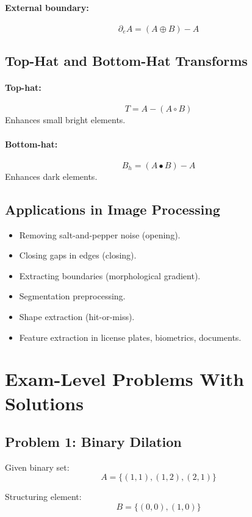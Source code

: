 \documentclass{AnantDocumentation}
\begin{document}
\paragraph{External boundary:}
\[
\partial_e A = (A \oplus B) - A
\]

\subsection{Top-Hat and Bottom-Hat Transforms}

\paragraph{Top-hat:}
\[
T = A - (A \circ B)
\]
Enhances small bright elements.

\paragraph{Bottom-hat:}
\[
B_h = (A \bullet B) - A
\]
Enhances dark elements.

\subsection{Applications in Image Processing}

\begin{itemize}
\item Removing salt-and-pepper noise (opening).
\item Closing gaps in edges (closing).
\item Extracting boundaries (morphological gradient).
\item Segmentation preprocessing.
\item Shape extraction (hit-or-miss).
\item Feature extraction in license plates, biometrics, documents.
\end{itemize}

\newpage
\section*{Exam-Level Problems With Solutions}

\subsection*{Problem 1: Binary Dilation}

Given binary set:
\[
A = \{(1,1),(1,2),(2,1)\}
\]

Structuring element:
\[
B = \{(0,0),(1,0)\}
\]
\end{document}
